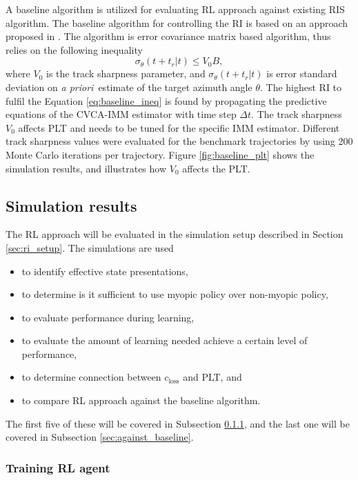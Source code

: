 \documentclass[english, 12pt, a4paper, elec, utf8, a-1b, online]{aaltothesis}
\def\prior{\textit{a priori}\ }
\newcommand{\dt}{\Delta t}
\newcommand{\closs}{c_\text{loss}}
\newcommand{\ri}{t_r}
\begin{document}
A baseline algorithm is utilized for evaluating RL approach against existing RIS algorithm.
The baseline algorithm for controlling the RI is based on an approach proposed in \cite{Daeipour1994}.
The algorithm is error covariance matrix based algorithm, thus relies on the following inequality
\begin{equation}\label{eq:baseline_ineq}
    \sigma_\theta(t+\ri|t) \leq V_0 B, 
\end{equation}
where $V_0$ is the track sharpness parameter, and $\sigma_\theta(t+\ri|t)$ is error standard deviation on \prior estimate of the target azimuth angle $\theta$.
The highest RI to fulfil the Equation \eqref{eq:baseline_ineq} is found by propagating the predictive equations of the CVCA-IMM estimator with time step $\dt$.
The track sharpness $V_0$ affects PLT and needs to be tuned for the specific IMM estimator.
Different track sharpness values were evaluated for the benchmark trajectories by  using 200 Monte Carlo iterations per trajectory.
Figure \ref{fig:baseline_plt} shows the simulation results, and illustrates how $V_0$ affects the PLT. 


\subsection{Simulation results}\label{sec:ri_sim}

The RL approach will be evaluated in the simulation setup described in Section \ref{sec:ri_setup}.
The simulations are used
\begin{itemize}
    \item to identify effective state presentations,
    \item to determine is it sufficient to use myopic policy over non-myopic policy,
    \item to evaluate performance during learning,
    \item to evaluate the amount of learning needed achieve a certain level of performance,
    \item to determine connection between $\closs$ and PLT, and
    \item to compare RL approach against the baseline algorithm.
\end{itemize}
The first five of these will be covered in Subsection \ref{sec:training}, and the last one will be covered in Subsection \ref{sec:against_baseline}.

\subsubsection{Training RL agent}\label{sec:training}
\end{document}
